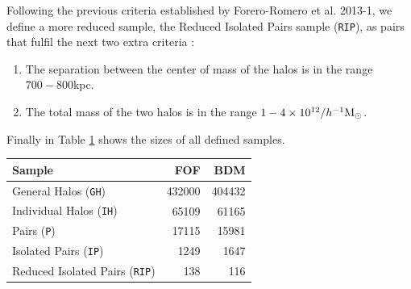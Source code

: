 \documentclass[a4,useAMS,usenatbib,usegraphicx]{latex/mn2e}
\begin{document}
Following the previous criteria established by Forero-Romero et al. 2013-1,
we define a more reduced sample, the Reduced Isolated Pairs sample 
(\texttt{RIP}), as pairs that fulfil the next two extra criteria :



\begin{enumerate}

\item{The separation between the center of mass of the halos is in the 
range $700-800$kpc.}

\item{The total mass of the two halos is in the range 
$1-4\times 10^{12}/\hMsun$.}

\end{enumerate}



Finally in Table \ref{tab:Samples_Size} shows the sizes of all defined 
samples. 


\begin{table}[h]
\begin{flushleft}
\begin{center}
  \begin{tabular}{l  r  r} \hline\hline
	\textbf{Sample}					&\textbf{FOF}&\textbf{BDM} \\ \hline
	General Halos (\texttt{GH}) 	& 432000	 & 404432  \\ 
	Individual Halos (\texttt{IH}) 	& 65109		 & 61165  \\ 
	Pairs (\texttt{P}) 	 			& 17115		 & 15981  \\ 
	Isolated Pairs (\texttt{IP})	& 1249		 & 1647  \\ 
	Reduced Isolated Pairs (\texttt{RIP})& 138	 & 116  \\ \hline\hline
  \end{tabular}  
  
  \label{tab:Samples_Size}
  
\end{center}
\end{flushleft}
\end{table}
\end{document}

